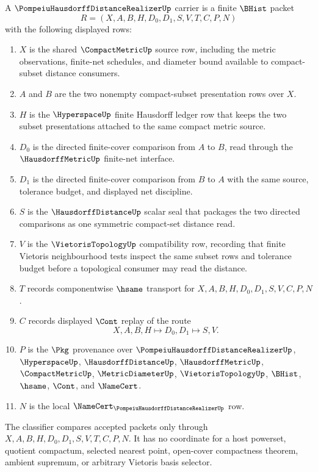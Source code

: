 \begin{definition}
\label{def:pompeiu-hausdorff-distance-realizer-carrier}
A $\PompeiuHausdorffDistanceRealizerUp$ carrier is a finite $\BHist$ packet
$$
R=(X,A,B,H,D_0,D_1,S,V,T,C,P,N)
$$
with the following displayed rows:
\begin{enumerate}
\item $X$ is the shared $\CompactMetricUp$ source row, including the metric observations, finite-net schedules, and diameter bound available to compact-subset distance consumers.
\item $A$ and $B$ are the two nonempty compact-subset presentation rows over $X$.
\item $H$ is the $\HyperspaceUp$ finite Hausdorff ledger row that keeps the two subset presentations attached to the same compact metric source.
\item $D_0$ is the directed finite-cover comparison from $A$ to $B$, read through the $\HausdorffMetricUp$ finite-net interface.
\item $D_1$ is the directed finite-cover comparison from $B$ to $A$ with the same source, tolerance budget, and displayed net discipline.
\item $S$ is the $\HausdorffDistanceUp$ scalar seal that packages the two directed comparisons as one symmetric compact-set distance read.
\item $V$ is the $\VietorisTopologyUp$ compatibility row, recording that finite Vietoris neighbourhood tests inspect the same subset rows and tolerance budget before a topological consumer may read the distance.
\item $T$ records componentwise $\hsame$ transport for $X,A,B,H,D_0,D_1,S,V,C,P,N$.
\item $C$ records displayed $\Cont$ replay of the route
$$
X,A,B,H \longmapsto D_0,D_1 \longmapsto S,V .
$$
\item $P$ is the $\Pkg$ provenance over $\PompeiuHausdorffDistanceRealizerUp$, $\HyperspaceUp$, $\HausdorffDistanceUp$, $\HausdorffMetricUp$, $\CompactMetricUp$, $\MetricDiameterUp$, $\VietorisTopologyUp$, $\BHist$, $\hsame$, $\Cont$, and $\NameCert$.
\item $N$ is the local $\NameCert_{\PompeiuHausdorffDistanceRealizerUp}$ row.
\end{enumerate}
The classifier compares accepted packets only through $X,A,B,H,D_0,D_1,S,V,T,C,P,N$. It has no coordinate for a host powerset, quotient compactum, selected nearest point, open-cover compactness theorem, ambient supremum, or arbitrary Vietoris basis selector.
\end{definition}


